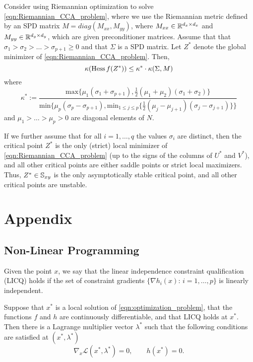 \documentclass[11pt,a4paper]{article}
\begin{document}
\begin{prop}
Consider using Riemannian optimization to solve \eqref{eqn:Riemannian_CCA_problem}, where we use the Riemannian metric defined by an SPD matrix $M = diag(M_{xx},M_{yy})$, where $M_{xx}\in\mathbb{R}^{d_x\times d_x}$ and $M_{yy}\in\mathbb{R}^{d_y\times d_y}$, which are given preconditioner matrices. Assume that that $\sigma_1>\sigma_2>\ldots>\sigma_{p+1}\ge 0$ and that $\Sigma$ is a SPD matrix. Let $Z^*$ denote the global minimizer of \eqref{eqn:Riemannian_CCA_problem}. Then,
\begin{equation*}
\kappa(\text{Hess}\, f(Z^*)) \le \kappa^*\cdot \kappa(\Sigma, M)
\end{equation*}
where 
\begin{equation*}
\kappa^* := \dfrac{\text{max}\{\mu_1(\sigma_1+\sigma_{p+1}),\frac{1}{2}(\mu_1+\mu_2)(\sigma_1+\sigma_{2})\}}{\text{min}\{\mu_p(\sigma_p-\sigma_{p+1}),{\text{min}}_{1\le j\le p}\{\frac{1}{2}(\mu_j-\mu_{j+1})(\sigma_j-\sigma_{j+1})\}\}}
\end{equation*}
and $\mu_1>\ldots>\mu_p>0$ are diagonal elements of $N$.

If we further assume that for all $i = 1,\ldots, q$ the values $\sigma_i$ are distinct, then the critical point $Z^*$ is the only (strict) local minimizer of \eqref{eqn:Riemannian_CCA_problem} (up to the signs of the columns of $U^*$ and $V^*$), and all other critical points are either saddle points or strict local maximizers. Thus, $Z^*\in \mathbb{S}_{xy}$ is the only asymptotically stable critical point, and all other critical points are unstable.
\end{prop}


\section{Appendix}

\subsection{Non-Linear Programming}

\begin{mydef}
Given the point $x$, we say that the linear independence constraint qualification (LICQ) holds if the set of constraint gradients $\{\nabla h_i(x):\,i = 1,\ldots,p\}$ is linearly independent.
\end{mydef}

\begin{prop}
Suppose that $x^*$ is a local solution of \eqref{eqn:optimization_problem}, that the functions $f$ and $h$ are continuously differentiable, and that LICQ holds at $x^*$. Then there is a Lagrange multiplier vector $\lambda^*$ such that the following conditions are satisfied at $(x^*,\lambda^*)$
\begin{equation}
\nabla_x \mathcal{L}(x^*,\lambda^*) = 0,\qquad h(x^*) = 0. 
\end{equation}
\end{prop}
\end{document}

